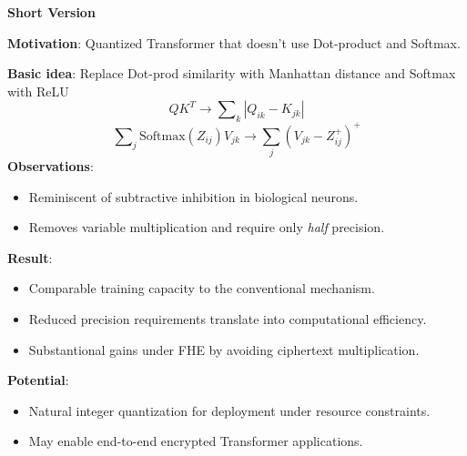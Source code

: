 \documentclass[12pt,oneside]{book}
\begin{document}
\begin{framed}
\begin{center}
    \Huge \textbf{Short Version}
\end{center}    
\huge
\noindent
\textbf{Motivation}: Quantized Transformer that doesn't use Dot-product and Softmax.
\vspace{0.2cm}

\noindent
\textbf{Basic idea}: 
Replace Dot-prod similarity with Manhattan distance and Softmax with ReLU
\begin{equation*}
Q K^T \rightarrow \sum\nolimits_{k} \left|Q_{ik} - K_{jk}\right|
\end{equation*}
\begin{equation*}
\sum\nolimits_{j} \mathrm{Softmax} \left(Z_{ij}\right) V_{jk}  \rightarrow \sum_j \left( V_{jk} - Z_{ij}^+  \right)^+
    \label{eq:inhibition}
\end{equation*}
%
\noindent
\textbf{Observations}:
\begin{itemize}%
    \item Reminiscent of subtractive inhibition in biological neurons.
    \item Removes variable multiplication and require only \textit{half} precision.
\end{itemize}

\noindent
\textbf{Result}: 

\begin{itemize}
    \item Comparable training capacity to the conventional mechanism.
    \item Reduced precision requirements translate into computational efficiency.
    \item Substantional gains under FHE by avoiding ciphertext multiplication.
\end{itemize}

\noindent
\textbf{Potential}: 
\begin{itemize}
    \item Natural integer quantization for deployment under resource constraints.
    \item May enable end-to-end encrypted Transformer applications.
\end{itemize}


\end{framed}
\end{document}
